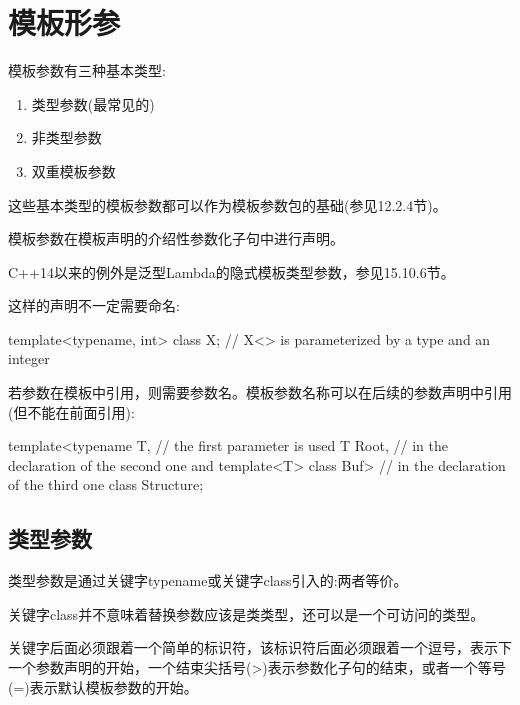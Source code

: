 \section{模板形参}

模板参数有三种基本类型:

\begin{enumerate}
\item 
类型参数(最常见的)

\item 
非类型参数

\item 
双重模板参数
\end{enumerate}	

这些基本类型的模板参数都可以作为模板参数包的基础(参见12.2.4节)。

模板参数在模板声明的介绍性参数化子句中进行声明。

\begin{notice}
C++14以来的例外是泛型Lambda的隐式模板类型参数，参见15.10.6节。
\end{notice}

这样的声明不一定需要命名:

\begin{cpp}
template<typename, int>
class X; // X<> is parameterized by a type and an integer
\end{cpp}

若参数在模板中引用，则需要参数名。模板参数名称可以在后续的参数声明中引用(但不能在前面引用):

\begin{cpp}
template<typename T, // the first parameter is used
		T Root, // in the declaration of the second one and
		template<T> class Buf> // in the declaration of the third one
class Structure;
\end{cpp}

\subsection{类型参数}

类型参数是通过关键字typename或关键字class引入的:两者等价。

\begin{notice}
关键字class并不意味着替换参数应该是类类型，还可以是一个可访问的类型。
\end{notice}

关键字后面必须跟着一个简单的标识符，该标识符后面必须跟着一个逗号，表示下一个参数声明的开始，一个结束尖括号(>)表示参数化子句的结束，或者一个等号(=)表示默认模板参数的开始。

